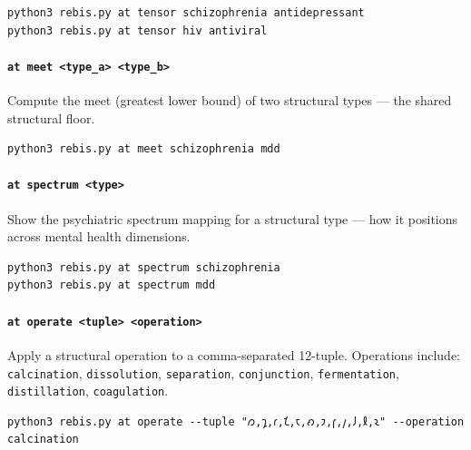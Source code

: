 \documentclass[12pt,a4paper]{article}
\begin{document}
\begin{verbatim}
python3 rebis.py at tensor schizophrenia antidepressant
python3 rebis.py at tensor hiv antiviral
\end{verbatim}

\hypertarget{at-meet-type_a-type_b}{%
\paragraph{\texorpdfstring{\texttt{at\ meet\ \textless{}type\_a\textgreater{}\ \textless{}type\_b\textgreater{}}}{at meet \textless type\_a\textgreater{} \textless type\_b\textgreater{}}}\label{at-meet-type_a-type_b}}

Compute the meet (greatest lower bound) of two structural types --- the
shared structural floor.

\begin{verbatim}
python3 rebis.py at meet schizophrenia mdd
\end{verbatim}

\hypertarget{at-spectrum-type}{%
\paragraph{\texorpdfstring{\texttt{at\ spectrum\ \textless{}type\textgreater{}}}{at spectrum \textless type\textgreater{}}}\label{at-spectrum-type}}

Show the psychiatric spectrum mapping for a structural type --- how it
positions across mental health dimensions.

\begin{verbatim}
python3 rebis.py at spectrum schizophrenia
python3 rebis.py at spectrum mdd
\end{verbatim}

\hypertarget{at-operate-tuple-operation}{%
\paragraph{\texorpdfstring{\texttt{at\ operate\ \textless{}tuple\textgreater{}\ \textless{}operation\textgreater{}}}{at operate \textless tuple\textgreater{} \textless operation\textgreater{}}}\label{at-operate-tuple-operation}}

Apply a structural operation to a comma-separated 12-tuple. Operations
include: \texttt{calcination}, \texttt{dissolution},
\texttt{separation}, \texttt{conjunction}, \texttt{fermentation},
\texttt{distillation}, \texttt{coagulation}.

\begin{verbatim}
python3 rebis.py at operate --tuple "𐑼,𐑡,𐑩,𐑗,𐑱,𐑺,𐑲,𐑝,𐑢,𐑓,𐑙,𐑷" --operation calcination
\end{verbatim}
\end{document}
